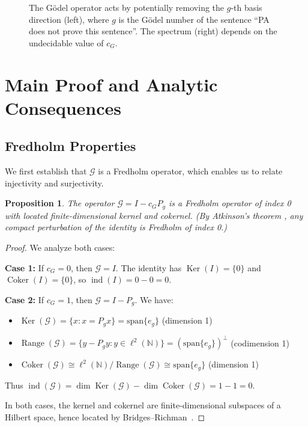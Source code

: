 \documentclass[11pt]{article}
\newtheorem{proposition}[theorem]{Proposition}
\theoremstyle{definition}
\newcommand{\N}{\mathbb{N}}
\newcommand{\lp}{\ell^{2}(\N)}
\DeclareMathOperator{\Range}{Range}
\DeclareMathOperator{\Ker}{Ker}
\DeclareMathOperator{\Coker}{Coker}
\DeclareMathOperator{\ind}{ind}
\begin{document}
\begin{figure}[!ht]
\caption{The Gödel operator acts by potentially removing the $g$-th basis direction (left), where $g$ is the Gödel number of the sentence ``PA does not prove this sentence''. The spectrum (right) depends on the undecidable value of $c_G$.}
\label{fig:operator_action}
\end{figure}

\section{Main Proof and Analytic Consequences}

\subsection{Fredholm Properties}

We first establish that $\mathcal{G}$ is a Fredholm operator, which enables us to relate injectivity and surjectivity.

\begin{proposition}\label{prop:fredholm}
The operator $\mathcal{G} = I - c_G P_g$ is a Fredholm operator of index 0 with located finite-dimensional kernel and cokernel. (By Atkinson's theorem \cite{Atk51}, any compact perturbation of the identity is Fredholm of index 0.)
\end{proposition}
\begin{proof}
We analyze both cases:

\textbf{Case 1:} If $c_G=0$, then $\mathcal{G} = I$. The identity has $\Ker(I)=\{0\}$ and $\Coker(I)=\{0\}$, so $\ind(I) = 0 - 0 = 0$.

\textbf{Case 2:} If $c_G=1$, then $\mathcal{G} = I - P_g$. We have:
\begin{itemize}
\item $\Ker(\mathcal{G}) = \{x : x = P_g x\} = \mathrm{span}\{e_g\}$ (dimension 1)
\item $\Range(\mathcal{G}) = \{y - P_g y : y \in \lp\} = (\mathrm{span}\{e_g\})^\perp$ (codimension 1)
\item $\Coker(\mathcal{G}) \cong \lp/\Range(\mathcal{G}) \cong \mathrm{span}\{e_g\}$ (dimension 1)
\end{itemize}
Thus $\ind(\mathcal{G}) = \dim\Ker(\mathcal{G}) - \dim\Coker(\mathcal{G}) = 1 - 1 = 0$.

In both cases, the kernel and cokernel are finite-dimensional subspaces of a Hilbert space, hence located by Bridges--Richman~\cite[Th.\,4.3.5]{BR87}.
\end{proof}
\end{document}
